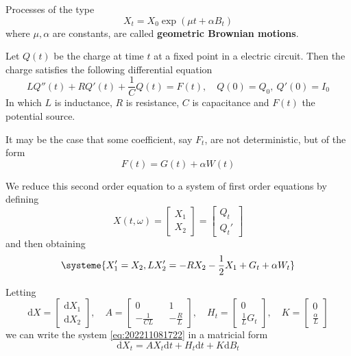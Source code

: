 \begin{definition}
    Processes of the type 
    \[
        X_t = X_0 \exp (\mu t + \alpha B_t)
    \]
    where $\mu, \alpha$ are constants, are called \textbf{geometric Brownian motions}.
\end{definition}

\begin{example}
    Let $Q(t)$ be the charge at time $t$ at a fixed point in a electric circuit. Then the charge satisfies the following differential equation
    \[
        L Q''(t) + R Q'(t) + \frac{1}{C}Q(t) = F(t), \quad Q(0) = Q_0, ~Q'(0) = I_0
    \]
    In which $L$ is inductance, $R$ is resistance, $C$ is capacitance and $F(t)$ the potential source.

    It may be the case that some coefficient, say $F_t$, are not deterministic, but of the form
    \[
        F(t) = G(t) + \alpha W(t)
    \]

    We reduce this second order equation to a system of first order equations by defining
    \[
        X(t, \omega) = \begin{bmatrix}
            X_1 \\
            X_2
        \end{bmatrix}
        = \begin{bmatrix}
            Q_t \\
            Q_t'
        \end{bmatrix}
    \]
    and then obtaining 
    \begin{equation}\label{eq:202211081722}
        \systeme{X_1' = X_2, LX_2' = -RX_2 - \frac{1}{2}X_1 + G_t + \alpha W_t}
    \end{equation}

    Letting 
    \[
        \mathrm{d}X = \begin{bmatrix}
            \mathrm{d}X_1 \\
            \mathrm{d}X_2
        \end{bmatrix}, \quad
        A = \begin{bmatrix}
            0 && 1 \\
            - \frac{1}{CL} && - \frac{R}{L}
        \end{bmatrix}, \quad
        H_t = \begin{bmatrix}
            0 \\
            \frac{1}{L} G_t
        \end{bmatrix}, \quad
        K = \begin{bmatrix}
            0 \\
            \frac{\alpha}{L}
        \end{bmatrix}
    \]
    we can write the system \eqref{eq:202211081722} in a matricial form
    \begin{equation}\label{eq:202211081727}
        \mathrm{d}X_t = AX_t \mathrm{d}t + H_t\mathrm{d}t + K \mathrm{d}B_t
    \end{equation}


\end{example}
